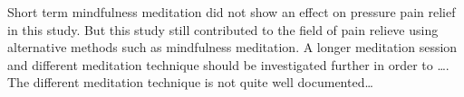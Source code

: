 Short term mindfulness meditation did not show an effect on pressure pain relief in this study. But this study still contributed to the field of pain relieve using alternative methods such as mindfulness meditation. A longer meditation session and different meditation technique should be investigated further in order to  …. The different meditation technique is not quite well documented… 
